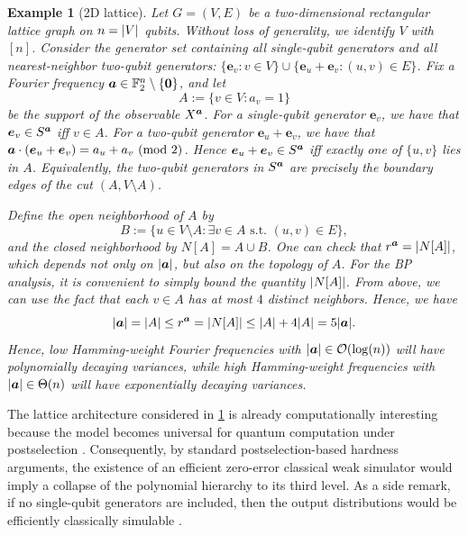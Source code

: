 \documentclass{article}
\theoremstyle{plain}
\newtheorem{example}[theorem]{Example}
\theoremstyle{definition}
\theoremstyle{remark}
\begin{document}
\begin{example}[2D lattice]
\label{eg:lattice}
Let $G=(V,E)$ be a two-dimensional rectangular lattice graph on $n=\abs{V}$ qubits. Without loss of generality, we identify $V$ with $[n]$. Consider the generator set containing all single-qubit generators and all nearest-neighbor two-qubit generators: $\{\bm{e}_v : v\in V\} \cup \{\bm{e}_u+\bm{e}_v : (u,v)\in E\}$. Fix a Fourier frequency ${\bm{a}} \in \mathbb{F}_2^n \setminus \{\bm{0}\}$, and let
\begin{equation*}
    A:=\{v\in V: a_v=1\}
\end{equation*}
be the support of the observable $X^{\bm{a}}$. For a single-qubit generator $\bm{e}_v$, we have that $\bm{e}_v\in S^{\bm{a}}$ iff $v\in A$. For a two-qubit generator $\bm{e}_u+\bm{e}_v$, we have that ${\bm{a}} \cdot (\bm{e}_u+\bm{e}_v)=a_u+a_v\ (\mathrm{mod}\ 2)$. Hence $\bm{e}_u+\bm{e}_v\in S^{\bm{a}}$ iff exactly one of $\{u,v\}$ lies in $A$. Equivalently, the two-qubit generators in $S^{\bm{a}}$ are precisely the boundary edges of the cut $(A, V\setminus A)$.

Define the open neighborhood of $A$ by
\begin{equation}
B := \{u\in V\setminus A: \exists v\in A  \text{ s.t. } (u,v)\in E\},
\end{equation}
and the closed neighborhood by $N[A] = A \cup B$.
One can check that $r^{\bm{a}} = \abs{N[A]}$, which depends not only on $\abs{{\bm{a}}}$, but also on the topology of $A$. For the BP analysis, it is convenient to simply bound the quantity $\abs{N[A]}$.
From above, we can use the fact that each $v\in A$ has at most $4$ distinct neighbors. Hence, we have
\begin{equation}
\abs{{\bm{a}}}=\abs{A} \leq  r^{\bm{a}}=\abs{N[A]} \leq \abs{A}+4\abs{A} = 5\abs{{\bm{a}}}.
\end{equation}
Hence, low Hamming-weight Fourier frequencies with $\abs{{\bm{a}}} \in \mathcal{O}(\log(n))$ will have polynomially decaying variances, while high Hamming-weight frequencies with $\abs{{\bm{a}}} \in \Theta(n)$ will have exponentially decaying variances.
\end{example}
The lattice architecture considered in \cref{eg:lattice} is already computationally interesting because the model becomes universal for quantum computation under postselection \cite{Fujii17}. Consequently, by standard postselection-based hardness arguments, the existence of an efficient zero-error classical weak simulator would imply a collapse of the polynomial hierarchy to its third level. As a side remark, if no single-qubit generators are included, then the output distributions would be efficiently classically simulable \cite{Fujii17}.
\end{document}
